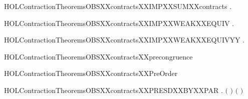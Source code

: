 \begin{SaveVerbatim}{HOLContractionTheoremsOBSXXcontractsXXIMPXXSUMXXcontracts}
\HOLTokenTurnstile{} \HOLSymConst{\HOLTokenForall{}} .    \HOLSymConst{\HOLTokenImp{}}   
\end{SaveVerbatim}
\newcommand{\HOLContractionTheoremsOBSXXcontractsXXIMPXXSUMXXcontracts}{\UseVerbatim{HOLContractionTheoremsOBSXXcontractsXXIMPXXSUMXXcontracts}}
\begin{SaveVerbatim}{HOLContractionTheoremsOBSXXcontractsXXIMPXXWEAKXXEQUIV}
\HOLTokenTurnstile{} \HOLSymConst{\HOLTokenForall{}} .    \HOLSymConst{\HOLTokenImp{}}   
\end{SaveVerbatim}
\newcommand{\HOLContractionTheoremsOBSXXcontractsXXIMPXXWEAKXXEQUIV}{\UseVerbatim{HOLContractionTheoremsOBSXXcontractsXXIMPXXWEAKXXEQUIV}}
\begin{SaveVerbatim}{HOLContractionTheoremsOBSXXcontractsXXIMPXXWEAKXXEQUIVYY}
\HOLTokenTurnstile{} \HOLSymConst{\HOLTokenForall{}} .    \HOLSymConst{\HOLTokenImp{}}   
\end{SaveVerbatim}
\newcommand{\HOLContractionTheoremsOBSXXcontractsXXIMPXXWEAKXXEQUIVYY}{\UseVerbatim{HOLContractionTheoremsOBSXXcontractsXXIMPXXWEAKXXEQUIVYY}}
\begin{SaveVerbatim}{HOLContractionTheoremsOBSXXcontractsXXprecongruence}
\HOLTokenTurnstile{}  
\end{SaveVerbatim}
\newcommand{\HOLContractionTheoremsOBSXXcontractsXXprecongruence}{\UseVerbatim{HOLContractionTheoremsOBSXXcontractsXXprecongruence}}
\begin{SaveVerbatim}{HOLContractionTheoremsOBSXXcontractsXXPreOrder}
\HOLTokenTurnstile{}  
\end{SaveVerbatim}
\newcommand{\HOLContractionTheoremsOBSXXcontractsXXPreOrder}{\UseVerbatim{HOLContractionTheoremsOBSXXcontractsXXPreOrder}}
\begin{SaveVerbatim}{HOLContractionTheoremsOBSXXcontractsXXPRESDXXBYXXPAR}
\HOLTokenTurnstile{} \HOLSymConst{\HOLTokenForall{}}   .
          \HOLSymConst{\HOLTokenConj{}}    \HOLSymConst{\HOLTokenImp{}}
        \ensuremath{(} \HOLSymConst{\ensuremath{\mid}} \ensuremath{)} \ensuremath{(} \HOLSymConst{\ensuremath{\mid}} \ensuremath{)}
\end{SaveVerbatim}
